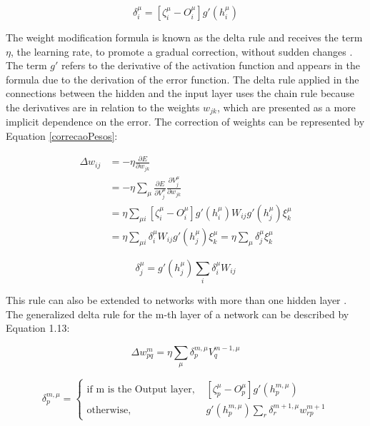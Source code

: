 \begin{equation*}
\delta_i^\mu=[\zeta_i^\mu-O_i^\mu]g'(h_i^\mu)
\end{equation*}

The weight modification formula is known as the delta rule and receives the term $\eta$, the learning rate, to promote a gradual correction, without sudden changes \cite{nielsen2015}. The term $g'$ refers to the derivative of the activation function and appears in the formula due to the derivation of the error function. The delta rule applied in the connections between the hidden and the input layer uses the chain rule because the derivatives are in relation to the weights $w_{jk}$, which are presented as a more implicit dependence on the error. The correction of weights can be represented by Equation \ref{correcaoPesos}:

\begin{equation}
\begin{split}
\Delta w_{ij}&=-\eta\frac{\partial E}{\partial w_{jk}}\\&=-\eta\sum_\mu\frac{\partial E}{\partial V_j^\mu}\frac{\partial V_j^\mu}{\partial w_{jk}}\\&=\eta\sum_{\mu i}[\zeta_i^\mu-O_i^\mu]g'(h_i^\mu)W_{ij}g'(h_j^\mu)\xi_k^\mu
\\&=\eta\sum_{\mu i}\delta_i^\mu W_{ij}g'(h_j^\mu)\xi_k^\mu=\eta\sum_\mu\delta_j^\mu\xi_k^\mu
\end{split}
\label{correcaoPesos}
\end{equation}

\begin{equation*}
\delta_j^\mu=g'(h_j^\mu)\sum_i\delta_i^\mu W_{ij}
\end{equation*}

This rule can also be extended to networks with more than one hidden layer \cite{rateke1999}. The generalized delta rule for the m-th layer of a network can be described by Equation 1.13:

\begin{equation}
\Delta w_{pq}^m=\eta\sum_\mu\delta_p^{m,\mu}V_q^{m-1,\mu}
\end{equation}

\begin{equation}
\delta_p^{m, \mu} =
  \begin{cases}
    \text{if m is the Output layer, } &[\zeta_p^\mu-O_p^\mu]g'(h_p^{m,\mu})\\
    \text{otherwise, } &g'(h_p^{m,\mu})\sum_r\delta_r^{m+1,\mu}w_{rp}^{m+1}
  \end{cases}
\end{equation}

